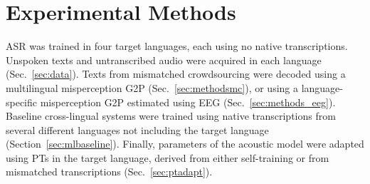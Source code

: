\section{Experimental Methods}
\label{sec:methods}

ASR was trained in four target languages, each using no native
transcriptions.  Unspoken texts and untranscribed audio were acquired
in each language (Sec.~\ref{sec:data}).  Texts from mismatched
crowdsourcing were decoded using a multilingual misperception G2P
(Sec.~\ref{sec:methodsmc}), or using a language-specific misperception
G2P estimated using EEG (Sec.~\ref{sec:methods_eeg}).  Baseline
cross-lingual systems were trained using native transcriptions from
several different languages not including the target language
(Section~\ref{sec:mlbaseline}).  Finally, parameters of the acoustic
model were adapted using PTs in the target language, derived from
either self-training or from mismatched transcriptions
(Sec.~\ref{sec:ptadapt}).

